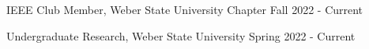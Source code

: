  






IEEE Club Member, Weber State University Chapter     \hfill Fall 2022 - Current

Undergraduate Research, Weber State University      \hfill Spring 2022 - Current



